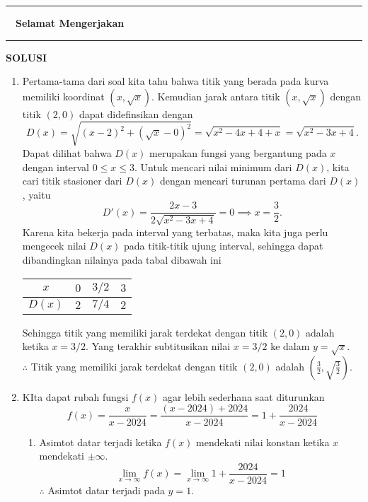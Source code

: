 \documentclass[10pt,openany,a4paper]{article}
\renewcommand{\headrulewidth}{0pt}
\begin{document}
    \begin{center}
        \rule{0.28\textwidth}{2.pt}$\quad$\textbf{Selamat Mengerjakan}$\quad$\rule{0.28\textwidth}{2.pt}
    \end{center}

    \newpage
    {\centering\textbf{SOLUSI}}
    \renewcommand{\arraystretch}{1.5}
    \renewcommand{\headrulewidth}{1pt}
    \begin{enumerate}
        \item Pertama-tama dari soal kita tahu bahwa titik yang berada pada kurva memiliki koordinat $(x, \sqrt{x})$. Kemudian jarak antara titik $(x, \sqrt{x})$ dengan titik $(2, 0)$ dapat didefinsikan dengan
        \[D(x)= \sqrt{(x-2)^2 + (\sqrt{x} - 0)^2} = \sqrt{x^2 - 4x + 4 + x} = \sqrt{x^2 - 3x + 4}.\]
        Dapat dilihat bahwa $D(x)$ merupakan fungsi yang bergantung pada $x$ dengan interval $0 \leq x \leq 3$. Untuk mencari nilai minimum dari $D(x)$, kita cari titik stasioner dari $D(x)$ dengan mencari turunan pertama dari $D(x)$, yaitu
        \[D'(x) = \frac{2x - 3}{2\sqrt{x^2 - 3x + 4}} = 0 \implies x = \frac{3}{2}.\]
        Karena kita bekerja pada interval yang terbatas, maka kita juga perlu mengecek nilai $D(x)$ pada titik-titik ujung interval, sehingga dapat dibandingkan nilainya pada tabal dibawah ini
        \begin{center}
            \begin{tabular}{|c|c|c|c|}
                \hline
                $x$ & $0$ & $3/2$ & $3$ \\ \hline
                $D(x)$ & $2$ & $7/4$ & $2$ \\ \hline
            \end{tabular}
        \end{center}
        Sehingga titik yang memiliki jarak terdekat dengan titik $(2, 0)$ adalah ketika $x = 3/2$. Yang terakhir subtitusikan nilai $x = 3/2$ ke dalam $y = \sqrt{x}$.\\

        $\therefore$ Titik yang memiliki jarak terdekat dengan titik $(2, 0)$ adalah $\left(\displaystyle\frac{3}{2}, \sqrt{\frac{3}{2}}\right)$.

        \item KIta dapat rubah fungsi $f(x)$ agar lebih sederhana saat diturunkan
        \[f(x) = \frac{x}{x - 2024} = \frac{(x-2024)+2024}{x-2024}=1+\frac{2024}{x-2024}\]
        \begin{enumerate}
            \item Asimtot datar terjadi ketika $f(x)$ mendekati nilai konstan ketika $x$ mendekati $\pm \infty$.
            \[\lim_{x \to \infty} f(x) = \lim_{x \to \infty} 1+\frac{2024}{x-2024} = 1\]
            $\therefore$ Asimtot datar terjadi pada $y = 1$. \\~\\


\end{enumerate}
\end{enumerate}
\end{document}
